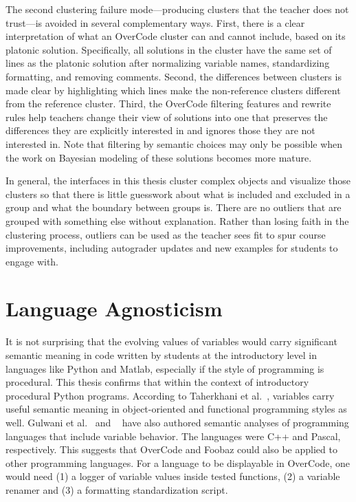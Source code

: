 The second clustering failure mode---producing clusters that the teacher does not trust---is avoided in several complementary ways. First, there is a clear interpretation of what an OverCode cluster can and cannot include, based on its platonic solution. Specifically, all solutions in the cluster have the same set of lines as the platonic solution after normalizing variable names, standardizing formatting, and removing comments. Second, the differences between clusters is made clear by highlighting which lines make the non-reference clusters different from the reference cluster. Third, the OverCode filtering features and rewrite rules help teachers change their view of solutions into one that preserves the differences they are explicitly interested in and ignores those they are not interested in. Note that filtering by semantic choices may only be possible when the work on Bayesian modeling of these solutions becomes more mature. 


In general, the interfaces in this thesis cluster complex objects and visualize those clusters so that there is little guesswork about what is included and excluded in a group and what the boundary between groups is. There are no outliers that are grouped with something else without explanation. Rather than losing faith in the clustering process, outliers can be used as the teacher sees fit to spur course improvements, including autograder updates and new examples for students to engage with. 

\section{Language Agnosticism}

It is not surprising that the evolving values of variables would carry significant semantic meaning in code written by students at the introductory level in languages like Python and Matlab, especially if the style of programming is procedural. This thesis confirms that within the context of introductory procedural Python programs. According to Taherkhani et al.~\cite{taherkhani2010recognizing}, variables carry useful semantic meaning in object-oriented and functional programming styles as well. Gulwani et al.~\cite{gulwani_fse14} and ~\cite{sajaniemi2002empirical} have also authored semantic analyses of programming languages that include variable behavior. The languages were C++ and Pascal, respectively. This suggests that OverCode and Foobaz could also be applied to other programming languages. For a language to be displayable in OverCode, one would need (1) a logger of variable values inside tested functions, (2) a variable renamer and (3) a formatting standardization script.

